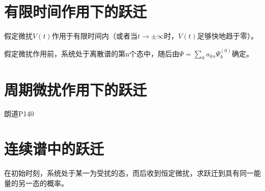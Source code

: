 \documentclass[12pt, a4paper, oneside]{ctexbook}
\newcounter{#2}
\newcounter{#2}[#1]
\numberwithin{#2}{#1}
\begin{document}
            \section{有限时间作用下的跃迁}
            \begin{assmp}
              假定微扰\(V(t)\)作用于有限时间内（或者当\(t\rightarrow\pm \infty\)时，\(V(t)\)足够快地趋于零）。
            \end{assmp}
            \begin{assmp}
              假定微扰作用前，系统处于离散谱的第n个态中，随后由\(\Psi=\sum_ka_{kn}\Psi_k^{(0)}\)确定。
            \end{assmp}
            \section{周期微扰作用下的跃迁}
            朗道P140
            \section{连续谱中的跃迁}
            \begin{assmp}
              在初始时刻，系统处于某一为受扰的态，而后收到恒定微扰，求跃迁到具有同一能量的另一态的概率。
            \end{assmp}
            


        
        
        
\end{document}
